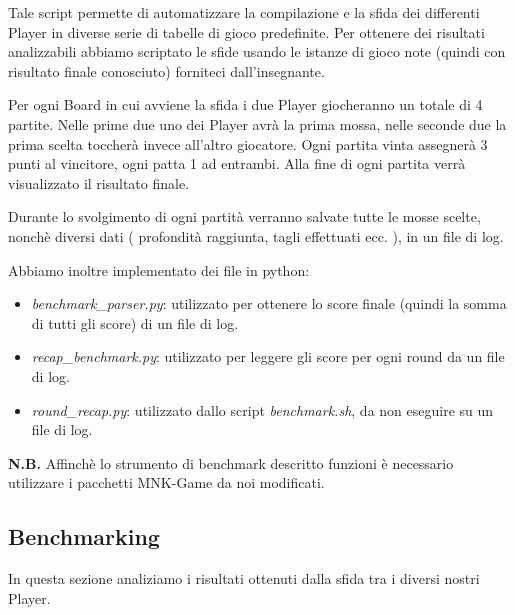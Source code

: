 \documentclass{article}
\begin{document}
Tale script permette di automatizzare la compilazione e la sfida dei differenti Player in diverse serie di tabelle di gioco predefinite. 
Per ottenere dei risultati analizzabili abbiamo scriptato le sfide usando le istanze di gioco note (quindi con risultato finale conosciuto) forniteci dall'insegnante. 

Per ogni Board in cui avviene la sfida i due Player giocheranno un totale di 4 partite.
Nelle prime due uno dei Player avrà la prima mossa, nelle seconde due la prima scelta toccherà invece all'altro giocatore.
Ogni partita vinta assegnerà 3 punti al vincitore, ogni patta 1 ad entrambi.
Alla fine di ogni partita verrà visualizzato il risultato finale.

Durante lo svolgimento di ogni partità verranno salvate tutte le mosse scelte, nonchè diversi dati ( profondità raggiunta, tagli effettuati ecc. ), in un file di log. 



Abbiamo inoltre implementato dei file in python:
\begin{itemize}
    \item \textit{benchmark\_parser.py}: utilizzato per ottenere lo score finale (quindi la somma di tutti gli score) di un file di log.
    \item \textit{recap\_benchmark.py}: utilizzato per leggere gli score per ogni round da un file di log.
    \item \textit{round\_recap.py}: utilizzato dallo script \textit{benchmark.sh}, da non eseguire su un file di log.
\end{itemize}

\textbf{N.B.} Affinchè lo strumento di benchmark descritto funzioni è necessario utilizzare i pacchetti MNK-Game da noi modificati.

\newpage

\subsection{Benchmarking}
In questa sezione analiziamo i risultati ottenuti dalla sfida tra i diversi nostri Player.
\end{document}
